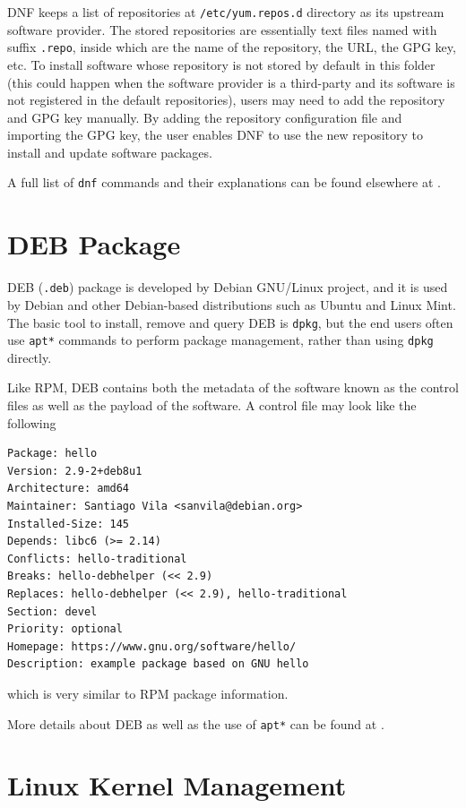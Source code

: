 DNF keeps a list of repositories at \verb|/etc/yum.repos.d| directory as its upstream software provider. The stored repositories are essentially text files named with suffix \verb|.repo|, inside which are the name of the repository, the URL, the GPG key, etc. To install software whose repository is not stored by default in this folder (this could happen when the software provider is a third-party and its software is not registered in the default repositories), users may need to add the repository and GPG key manually. By adding the repository configuration file and importing the GPG key, the user enables DNF to use the new repository to install and update software packages.

A full list of \verb|dnf| commands and their explanations can be found elsewhere at \cite{redhat2024dnf}.

\section{DEB Package}

DEB (\verb|.deb|) package is developed by Debian GNU/Linux project, and it is used by Debian and other Debian-based distributions such as Ubuntu and Linux Mint. The basic tool to install, remove and query DEB is \verb|dpkg|, but the end users often use \verb|apt*| commands to perform package management, rather than using \verb|dpkg| directly.

Like RPM, DEB contains both the metadata of the software known as the control files as well as the payload of the software. A control file may look like the following \cite{debian2024debianpackagemanagement}
\begin{lstlisting}
Package: hello
Version: 2.9-2+deb8u1
Architecture: amd64
Maintainer: Santiago Vila <sanvila@debian.org>
Installed-Size: 145
Depends: libc6 (>= 2.14)
Conflicts: hello-traditional
Breaks: hello-debhelper (<< 2.9)
Replaces: hello-debhelper (<< 2.9), hello-traditional
Section: devel
Priority: optional
Homepage: https://www.gnu.org/software/hello/
Description: example package based on GNU hello
\end{lstlisting}
which is very similar to RPM package information.

More details about DEB as well as the use of \verb|apt*| can be found at \cite{debian2024debianpackagemanagement}.

\section{Linux Kernel Management}

